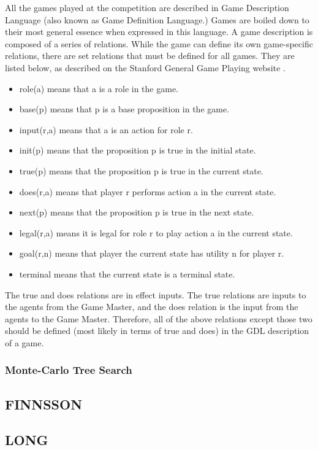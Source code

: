 \documentclass[letterpaper]{article}
\begin{document}
All the games played at the competition are described in Game Description Language (also known as Game Definition Language.) Games are boiled down to their most general essence when expressed in this language. A game description is composed of a series of relations. While the game can define its own game-specific relations, there are set relations that must be defined for all games. They are listed below, as described on the Stanford General Game Playing website \cite{StanfordGGP}.
\begin{itemize}
\item role(a) means that a is a role in the game.
\item base(p) means that p is a base proposition in the game.
\item input(r,a) means that a is an action for role r.
\item init(p) means that the proposition p is true in the initial state.
\item true(p) means that the proposition p is true in the current state.
\item does(r,a) means that player r performs action a in the current state.
\item next(p) means that the proposition p is true in the next state.
\item legal(r,a) means it is legal for role r to play action a in the current state.
\item goal(r,n) means that player the current state has utility n for player r.
\item terminal means that the current state is a terminal state.
\end{itemize}

The true and does relations are in effect inputs. The true relations are inputs to the agents from the Game Master, and the does relation is the input from the agents to the Game Master. Therefore, all of the above relations except those two should be defined (most likely in terms of true and does) in the GDL description of a game.

\subsubsection{Monte-Carlo Tree Search}

\subsection{FINNSSON}

\subsection{LONG}
\end{document}
